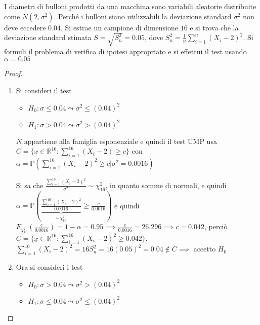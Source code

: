 \documentclass[hidelinks, 10pt]{report}
\begin{document}
\begin{ex}
I diametri di bulloni prodotti da una macchina sono variabili aleatorie distribuite come $ N(2, \sigma^{2}) $. Perch\'e i bulloni siano utilizzabili la deviazione standard $ \sigma^{2} $ non deve eccedere $ 0.04 $. Si estrae un campione di dimensione $ 16 $ e si trova che la deviazione standard stimata $ S = \sqrt{S^{2}_{n}} = 0.05 $, dove $ S^{2}_{n} = \frac{1}{n} \sum\limits_{i = 1}^{n} (X_{i} - 2)^{2} $. Si formuli il problema di verifica di ipotesi appropriato e si effettui il test usando $ \alpha = 0.05 $
\end{ex}

\begin{proof}
\noindent
\begin{enumerate}
\item Si consideri il test
\begin{itemize}
\item $ H_{0}: \sigma \le 0.04 \leadsto \sigma^{2} \le (0.04)^{2} $
\item $ H_{1}: \sigma > 0.04 \leadsto \sigma^{2} > (0.04)^{2} $
\end{itemize}

$ N $ appartiene alla famiglia esponenziale e quindi il test UMP usa $ C = \{ \underline{x} \in \mathbb{R}^{16} : \sum\limits_{i = 1}^{16} (X_{i} - 2) \ge c \} $ con $ \alpha = \mathbb{P} (\sum\limits_{i = 1}^{16} (X_{i} - 2)^{2} \ge c \vert \sigma^{2} = 0.0016) $

Si sa che $ \frac{\sum\limits_{i = 1}^{16} (X_{i} - 2)^{2}}{\sigma^{2}} \sim \chi^{2}_{16} $, in quanto somme di normali, e quindi $ \alpha = \mathbb{P} \left( \underbrace{\frac{\sum\limits_{i = 1}^{16} (X_{i} - 2)^{2}}{0.0016}}_{\sim \chi^{2}_{16}} \ge \frac{c}{0.0016} \right) $ e quindi $ F_{\chi^{2}_{16}} \left( \frac{c}{0.0016} \right) = 1 - \alpha = 0.95  \implies \frac{c}{0.0016} = 26.296 \implies c = 0.042 $, perci\`o $ C = \{ \underline{x} \in \mathbb{R}^{16} : \sum\limits_{i = 1}^{16} (X_{i} - 2)^{2} \ge 0.042 \} $. $ \sum\limits_{i = 1}^{16} (X_{i} - 2)^{2} = 16 S_{n}^{2} = 16 (0.05)^{2} = 0.04 \not\in C \implies $ accetto $ H_{0} $

\item Ora si consideri i test
\begin{itemize}
\item $ H_{0}: \sigma > 0.04 \leadsto \sigma^{2} > (0.04)^{2} $
\item $ H_{1}: \sigma \le 0.04 \leadsto \sigma^{2} \le (0.04)^{2} $
\end{itemize}


\end{enumerate}
\end{proof}
\end{document}
